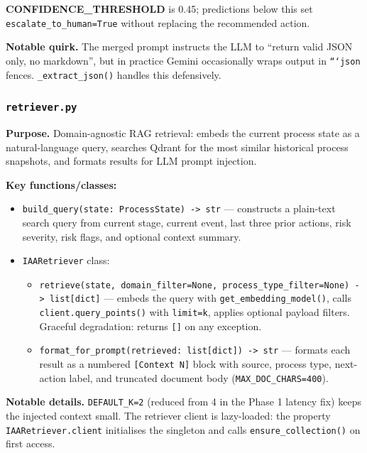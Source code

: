 \documentclass[12pt,a4paper]{article}
\begin{document}
\textbf{CONFIDENCE\_THRESHOLD} is 0.45; predictions below this set
\texttt{escalate\_to\_human=True} without replacing the recommended action.

\textbf{Notable quirk.} The merged prompt instructs the LLM to ``return valid JSON
only, no markdown'', but in practice Gemini occasionally wraps output in
\texttt{```json} fences. \texttt{\_extract\_json()} handles this defensively.

\subsubsection{\texttt{retriever.py}}

\textbf{Purpose.} Domain-agnostic RAG retrieval: embeds the current process state
as a natural-language query, searches Qdrant for the most similar historical
process snapshots, and formats results for LLM prompt injection.

\textbf{Key functions/classes:}
\begin{itemize}[nosep]
  \item \texttt{build\_query(state: ProcessState) -> str} --- constructs a plain-text
    search query from current stage, current event, last three prior actions, risk
    severity, risk flags, and optional context summary.
  \item \texttt{IAARetriever} class:
    \begin{itemize}[nosep]
      \item \texttt{retrieve(state, domain\_filter=None, process\_type\_filter=None) -> list[dict]} ---
        embeds the query with \texttt{get\_embedding\_model()}, calls
        \texttt{client.query\_points()} with \texttt{limit=k}, applies optional
        payload filters. Graceful degradation: returns \texttt{[]} on any exception.
      \item \texttt{format\_for\_prompt(retrieved: list[dict]) -> str} --- formats
        each result as a numbered \texttt{[Context N]} block with source, process type,
        next-action label, and truncated document body (\texttt{MAX\_DOC\_CHARS=400}).
    \end{itemize}
\end{itemize}

\textbf{Notable details.} \texttt{DEFAULT\_K=2} (reduced from 4 in the Phase 1
latency fix) keeps the injected context small. The retriever client is lazy-loaded:
the property \texttt{IAARetriever.client} initialises the singleton and calls
\texttt{ensure\_collection()} on first access.
\end{document}

